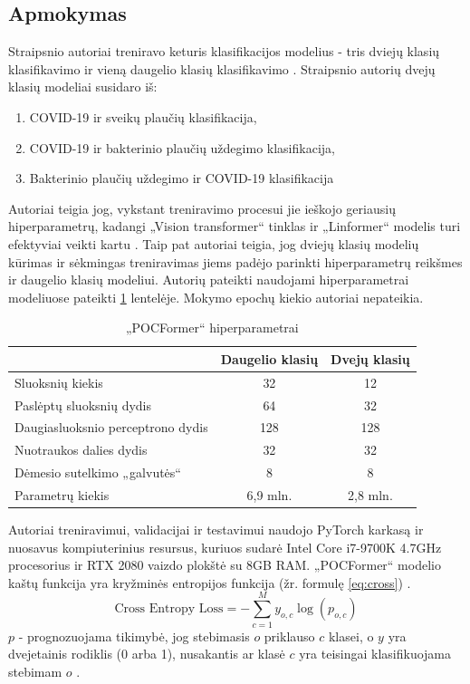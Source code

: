 \documentclass[fleqn]{VUMIFKompMagistrinis}
\begin{document}
\subsection{Apmokymas}
Straipsnio autoriai treniravo keturis klasifikacijos modelius - tris dviejų klasių klasifikavimo ir vieną daugelio klasių klasifikavimo \cite{PAY21}. Straipsnio autorių dvejų klasių modeliai susidaro iš:
\begin{enumerate}
    \item COVID-19 ir sveikų plaučių klasifikacija,
    \item COVID-19 ir bakterinio plaučių uždegimo klasifikacija,
    \item Bakterinio plaučių uždegimo ir COVID-19 klasifikacija
\end{enumerate}
\par 
Autoriai teigia jog, vykstant treniravimo procesui jie ieškojo geriausių hiperparametrų, kadangi „Vision transformer“ tinklas ir „Linformer“ modelis turi efektyviai veikti kartu \cite{PAY21}. Taip pat autoriai teigia, jog dviejų klasių modelių kūrimas ir sėkmingas treniravimas jiems padėjo parinkti hiperparametrų reikšmes ir daugelio klasių modeliui. Autorių pateikti naudojami hiperparametrai modeliuose pateikti \ref{tab:parametrai1} lentelėje. Mokymo epochų kiekio autoriai nepateikia. 
\begin{table}[H]\footnotesize
  \centering
  \caption{„POCFormer“ hiperparametrai \cite{PAY21}}
  \begin{tabular}{|l|c|c|} \hline
     & Daugelio klasių & Dvejų klasių \\
    \hline
    Sluoksnių kiekis &  32&  12 \\
    Paslėptų sluoksnių dydis &  64&  32 \\
    Daugiasluoksnio perceptrono dydis &  128&  128 \\
    Nuotraukos dalies dydis &  32&  32 \\
    Dėmesio sutelkimo „galvutės“ &  8&  8 \\
    Parametrų kiekis &  6,9 mln.&  2,8 mln. \\
    \hline
  \end{tabular}
  \label{tab:parametrai1}
\end{table}
\par
Autoriai treniravimui, validacijai ir testavimui naudojo PyTorch karkasą ir nuosavus kompiuterinius resursus, kuriuos sudarė Intel Core i7-9700K 4.7GHz procesorius ir RTX 2080 vaizdo plokštė su 8GB RAM. „POCFormer“ modelio kaštų funkcija yra kryžminės entropijos funkcija (žr. formulę \ref{eq:cross}) \cite{PAY21}.\begin{equation}\label{eq:cross}
\text{Cross Entropy Loss} = - \sum_{c=1}^{M} y_{o,c} \log(p_{o,c})
\end{equation}
\( p \) - prognozuojama tikimybė, jog stebimasis \(o\) priklauso \(c\)  klasei, o \(y\) yra dvejetainis rodiklis (0 arba 1), nusakantis ar klasė \(c\) yra teisingai klasifikuojama stebimam \(o\) \cite{PAY21}.
\end{document}

